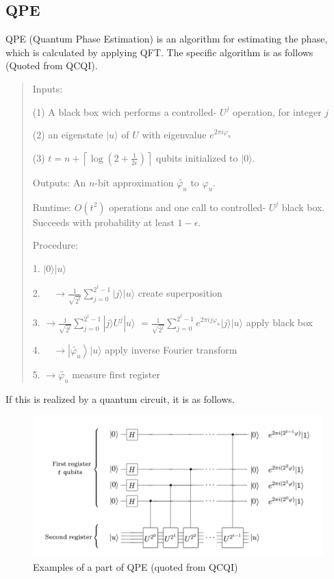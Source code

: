 \documentclass[b5paper,papersize,dvipdfmx,fleqn]{article}
\begin{document}
\subsection{QPE}
QPE (Quantum Phase Estimation) is an algorithm for estimating the phase, which is calculated by applying QFT. The specific algorithm is as follows (Quoted from QCQI).
\begin{quotation}

  Inputs:

   (1) A black box wich performs a controlled- $U^{j}$ operation, for integer $j$

   (2) an eigenstate $|u\rangle$ of $U$ with eigenvalue $e^{2 \pi i \varphi_{u}}$

   (3) $t=n+\left\lceil\log \left(2+\frac{1}{2 \epsilon}\right)\right\rceil$ qubits initialized to $|0\rangle$.


  Outputs: An $n$-bit approximation $\widetilde{\varphi_{u}}$ to $\varphi_{u} .$


  Runtime: $O\left(t^{2}\right)$ operations and one call to controlled- $U^{j}$ black box. Succeeds with probability at least $1-\epsilon$.


  Procedure:


  1. $|0\rangle|u\rangle$


  2. $\quad \rightarrow \frac{1}{\sqrt{2^{t}}} \sum_{j=0}^{2^{t}-1}|j\rangle|u\rangle$ create superposition


  3. $\rightarrow \frac{1}{\sqrt{2^{t}}} \sum_{j=0}^{2^{t}-1}|j\rangle U^{j}|u\rangle$ $=\frac{1}{\sqrt{2^{t}}} \sum_{j=0}^{2^{t}-1} e^{2 \pi i j \varphi_{u}}|j\rangle|u\rangle$ apply black box


  4. $\quad \rightarrow\left|\widetilde{\varphi_{u}}\right\rangle|u\rangle$ apply inverse Fourier transform


  5. $\rightarrow \widetilde{\varphi_{u}}$ measure first register
\end{quotation}


If this is realized by a quantum circuit, it is as follows.
\begin{center}
  \begin{figure}[H]
       \includegraphics[width=\textwidth]{qpe.pdf}
       \caption{Examples of a part of QPE (quoted from QCQI)}
       \label{circuit}
  \end{figure}
\end{center}
\end{document}
